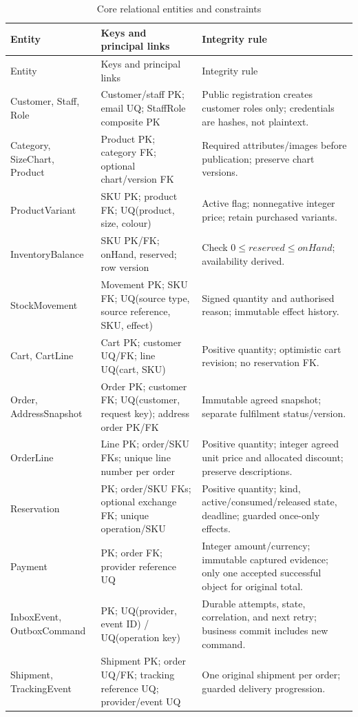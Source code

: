 \begin{longtable}{P{.2\linewidth}P{.35\linewidth}P{.34\linewidth}}
\caption{Core relational entities and constraints}\label{tab:db}\\
\toprule Entity & Keys and principal links & Integrity rule \\\midrule\endfirsthead
\toprule Entity & Keys and principal links & Integrity rule \\\midrule\endhead
Customer, Staff, Role & Customer/staff PK; email UQ; StaffRole composite PK & Public registration creates customer roles only; credentials are hashes, not plaintext.\\
Category, SizeChart, Product & Product PK; category FK; optional chart/version FK & Required attributes/images before publication; preserve chart versions.\\
ProductVariant & SKU PK; product FK; UQ(product, size, colour) & Active flag; nonnegative integer price; retain purchased variants.\\
InventoryBalance & SKU PK/FK; onHand, reserved; row version & Check $0\leq reserved\leq onHand$; availability derived.\\
StockMovement & Movement PK; SKU FK; UQ(source type, source reference, SKU, effect) & Signed quantity and authorised reason; immutable effect history.\\
Cart, CartLine & Cart PK; customer UQ/FK; line UQ(cart, SKU) & Positive quantity; optimistic cart revision; no reservation FK.\\
Order, AddressSnapshot & Order PK; customer FK; UQ(customer, request key); address order PK/FK & Immutable agreed snapshot; separate fulfilment status/version.\\
OrderLine & Line PK; order/SKU FKs; unique line number per order & Positive quantity; integer agreed unit price and allocated discount; preserve descriptions.\\
Reservation & PK; order/SKU FKs; optional exchange FK; unique operation/SKU & Positive quantity; kind, active/consumed/released state, deadline; guarded once-only effects.\\
Payment & PK; order FK; provider reference UQ & Integer amount/currency; immutable captured evidence; only one accepted successful object for original total.\\
InboxEvent, OutboxCommand & PK; UQ(provider, event ID) / UQ(operation key) & Durable attempts, state, correlation, and next retry; business commit includes new command.\\
Shipment, TrackingEvent & Shipment PK; order UQ/FK; tracking reference UQ; provider/event UQ & One original shipment per order; guarded delivery progression.\\

\end{longtable}

